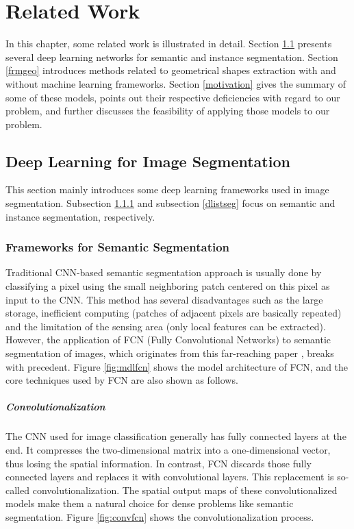 \chapter{Related Work}\label{rltwrk}
In this chapter, some related work is illustrated in detail. Section \ref{dlimgseg} presents several deep learning networks for semantic and instance segmentation. Section \ref{frmgeo} introduces methods related to geometrical shapes extraction with and without machine learning frameworks. Section \ref{motivation} gives the summary of some of these models, points out their respective deficiencies with regard to our problem, and further discusses the feasibility of applying those models to our problem.

\section{Deep Learning for Image Segmentation}\label{dlimgseg}
This section mainly introduces some deep learning frameworks used in image segmentation. Subsection \ref{dlsemseg} and subsection \ref{dlistseg} focus on semantic and instance segmentation, respectively.

\subsection{Frameworks for Semantic Segmentation}\label{dlsemseg}
Traditional CNN-based semantic segmentation approach is usually done by classifying a pixel using the small neighboring patch centered on this pixel as input to the CNN. This method has several disadvantages such as the large storage, inefficient computing (patches of adjacent pixels are basically repeated) and the limitation of the sensing area (only local features can be extracted). However, the application of FCN (Fully Convolutional Networks) to semantic segmentation of images, which originates from this far-reaching paper \cite{fcn}, breaks with precedent. Figure \ref{fig:mdlfcn} shows the model architecture of FCN, and the core techniques used by FCN are also shown as follows.



\paragraph{Convolutionalization}
The CNN used for image classification generally has fully connected layers at the end. It compresses the two-dimensional matrix into a one-dimensional vector, thus losing the spatial information. In contrast, FCN discards those fully connected layers and replaces it with convolutional layers. This replacement is so-called convolutionalization. The spatial output maps of these convolutionalized models make them a natural choice for dense problems like semantic segmentation. Figure \ref{fig:convfcn} shows the convolutionalization process.

